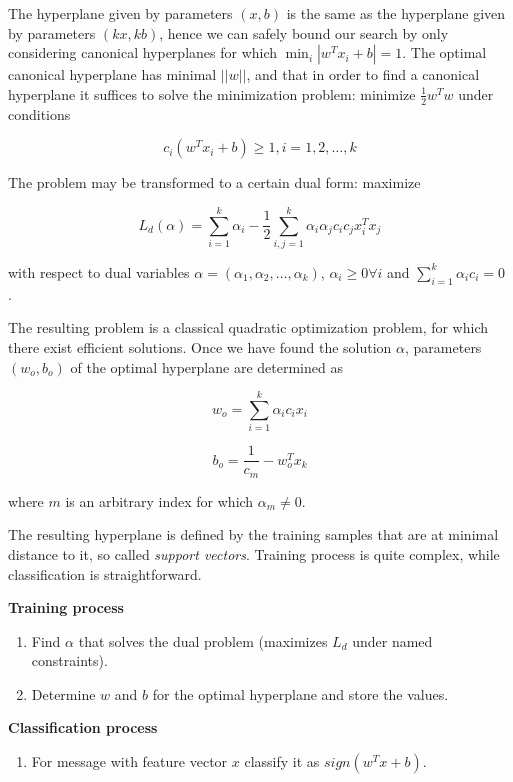 \documentclass[12pt]{report}
\begin{document}
The hyperplane given by parameters $(x, b)$ is the same as the hyperplane given by parameters $(kx, kb)$, hence we can safely bound our search by only considering canonical hyperplanes for which $\min_i |w^T x_i + b| = 1$. The optimal canonical hyperplane has minimal $||w||$, and that in order to find a canonical hyperplane it suffices to solve the minimization problem: minimize $\frac{1}{2} w^T w$ under conditions

$$c_i(w^T x_i + b) \ge 1, i = 1, 2, \dots, k$$

The problem may be transformed to a certain dual form: maximize

$$L_d(\alpha) = \sum_{i = 1}^{k} \alpha_i - \frac{1}{2} \sum_{i, j = 1}^{k} \alpha_i \alpha_j c_i c_j x_i^T x_j$$

with respect to dual variables $\alpha = (\alpha_1, \alpha_2, \dots, \alpha_k)$, $\alpha_i \ge 0 \forall i$ and $\sum_{i = 1}^{k} \alpha_i c_i = 0$ \cite{Cristianini}.

The resulting problem is a classical quadratic optimization problem, for which there exist efficient solutions. Once we have found the solution $\alpha$, parameters $(w_o, b_o)$ of the optimal hyperplane are determined as

$$w_o = \sum_{i = 1}^{k} \alpha_i c_i x_i$$

$$b_o = \frac{1}{c_m} - w_o^T x_k$$

where $m$ is an arbitrary index for which $\alpha_m \ne 0$.

The resulting hyperplane is defined by the training samples that are at minimal distance to it, so called \textit{support vectors}. Training process is quite complex, while classification is straightforward.

\textbf{Training process}

\begin{enumerate}
	\item Find $\alpha$ that solves the dual problem (maximizes $L_d$ under named
	constraints).
	\item Determine $w$ and $b$ for the optimal hyperplane and store the values.
\end{enumerate}

\textbf{Classification process}

\begin{enumerate}
	\item For message with feature vector $x$ classify it as $sign(w^T x + b)$.
\end{enumerate}
\end{document}
